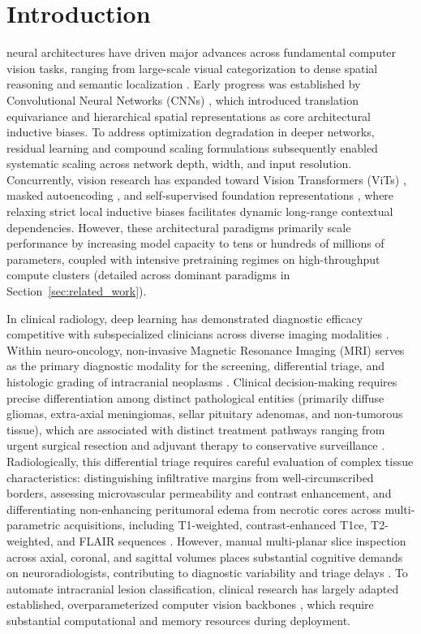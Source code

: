 \section{Introduction}
 neural architectures have driven major advances across fundamental computer vision tasks, ranging from large-scale visual categorization \cite{8, 19} to dense spatial reasoning and semantic localization \cite{10, 37}. Early progress was established by Convolutional Neural Networks (CNNs) \cite{15, 18}, which introduced translation equivariance and hierarchical spatial representations as core architectural inductive biases. To address optimization degradation in deeper networks, residual learning \cite{10} and compound scaling formulations \cite{30} subsequently enabled systematic scaling across network depth, width, and input resolution. Concurrently, vision research has expanded toward Vision Transformers (ViTs) \cite{6, 33}, masked autoencoding \cite{34}, and self-supervised foundation representations \cite{1}, where relaxing strict local inductive biases facilitates dynamic long-range contextual dependencies. However, these architectural paradigms primarily scale performance by increasing model capacity to tens or hundreds of millions of parameters, coupled with intensive pretraining regimes on high-throughput compute clusters \cite{8, 32} (detailed across dominant paradigms in Section~\ref{sec:related_work}).

In clinical radiology, deep learning has demonstrated diagnostic efficacy competitive with subspecialized clinicians across diverse imaging modalities \cite{7, 28}. Within neuro-oncology, non-invasive Magnetic Resonance Imaging (MRI) serves as the primary diagnostic modality for the screening, differential triage, and histologic grading of intracranial neoplasms \cite{2, 26, 38}. Clinical decision-making requires precise differentiation among distinct pathological entities (primarily diffuse gliomas, extra-axial meningiomas, sellar pituitary adenomas, and non-tumorous tissue), which are associated with distinct treatment pathways ranging from urgent surgical resection and adjuvant therapy to conservative surveillance \cite{26, 40}. Radiologically, this differential triage requires careful evaluation of complex tissue characteristics: distinguishing infiltrative margins from well-circumscribed borders, assessing microvascular permeability and contrast enhancement, and differentiating non-enhancing peritumoral edema from necrotic cores across multi-parametric acquisitions, including T1-weighted, contrast-enhanced T1ce, T2-weighted, and FLAIR sequences \cite{2, 28, 38}. However, manual multi-planar slice inspection across axial, coronal, and sagittal volumes places substantial cognitive demands on neuroradiologists, contributing to diagnostic variability and triage delays \cite{7, 40}. To automate intracranial lesion classification, clinical research has largely adapted established, overparameterized computer vision backbones \cite{7, 39, 40}, which require substantial computational and memory resources during deployment.

